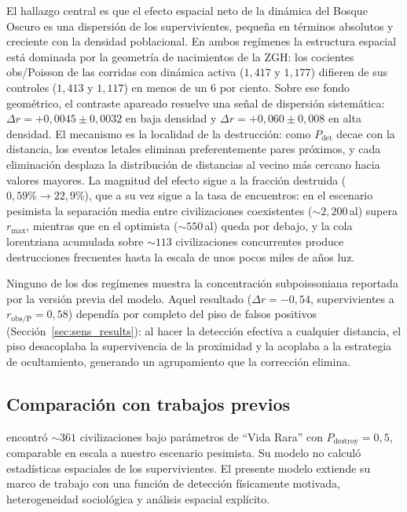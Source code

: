 \documentclass[useAMS,usenatbib,onecolumn]{mn2e}
\begin{document}
El hallazgo central es que el efecto espacial neto de la dinámica del
Bosque Oscuro es una dispersión de los supervivientes, pequeña en
términos absolutos y creciente con la densidad poblacional.
En ambos regímenes la estructura espacial está dominada por la
geometría de nacimientos de la ZGH: los cocientes obs/Poisson de las
corridas con dinámica activa ($1{,}417$ y $1{,}177$) difieren de sus
controles ($1{,}413$ y $1{,}117$) en menos de un 6 por ciento.
Sobre ese fondo geométrico, el contraste apareado resuelve una señal
de dispersión sistemática: $\Delta r = +0{,}0045 \pm 0{,}0032$ en baja
densidad y $\Delta r = +0{,}060 \pm 0{,}008$ en alta densidad.
El mecanismo es la localidad de la destrucción: como
$P_\text{det}$ decae con la distancia, los eventos letales eliminan
preferentemente pares próximos, y cada eliminación desplaza la
distribución de distancias al vecino más cercano hacia valores
mayores.
La magnitud del efecto sigue a la fracción destruida
($0{,}59\% \to 22{,}9\%$), que a su vez sigue a la tasa de encuentros:
en el escenario pesimista la separación media entre civilizaciones
coexistentes ($\sim 2{,}200$\,al) supera $r_\text{max}$, mientras que
en el optimista ($\sim 550$\,al) queda por debajo, y la cola
lorentziana acumulada sobre $\sim 113$ civilizaciones concurrentes
produce destrucciones frecuentes hasta la escala de unos pocos miles
de años luz.

Ninguno de los dos regímenes muestra la concentración subpoissoniana
reportada por la versión previa del modelo.
Aquel resultado ($\Delta r = -0{,}54$, supervivientes a
$r_\text{obs/P} = 0{,}58$) dependía por completo del piso de falsos
positivos (Sección~\ref{sec:sens_results}): al hacer la detección
efectiva a cualquier distancia, el piso desacoplaba la supervivencia
de la proximidad y la acoplaba a la estrategia de ocultamiento,
generando un agrupamiento que la corrección elimina.

\subsection{Comparación con trabajos previos}

\citet{forgan2009} encontró $\sim 361$ civilizaciones bajo parámetros
de ``Vida Rara'' con $P_\text{destroy} = 0{,}5$, comparable en escala
a nuestro escenario pesimista.
Su modelo no calculó estadísticas espaciales de los supervivientes.
El presente modelo extiende su marco de trabajo con una función de
detección físicamente motivada, heterogeneidad sociológica y análisis
espacial explícito.
\end{document}
